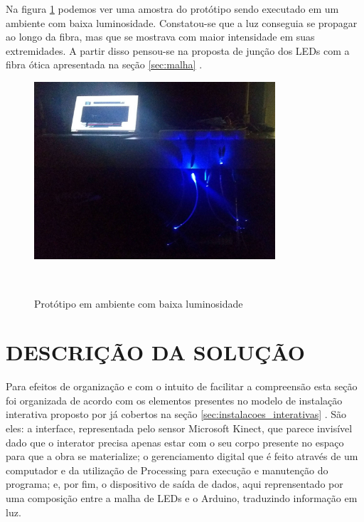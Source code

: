 Na figura \ref{fig:prototipo_escuro} podemos ver uma amostra do protótipo sendo executado em um ambiente com baixa luminosidade. Constatou-se que a luz conseguia se propagar ao longo da fibra, mas que se mostrava com maior intensidade em suas extremidades. A partir disso pensou-se na proposta de junção dos LEDs com a fibra ótica apresentada na seção \ref{sec:malha} .

\begin{figure}[H]
  \begin{center}
    \caption{Protótipo em ambiente com baixa luminosidade}
    \vspace*{0,2cm}
    \includegraphics[width=0.8\textwidth]{./04-figuras/prototipo_escuro}
    \label{fig:prototipo_escuro}
  \end{center}
  \vspace*{-0,9cm}
  \\
\end{figure}

\section{DESCRIÇÃO DA SOLUÇÃO}
\label{sec:solucao}

Para efeitos de organização e com o intuito de facilitar a compreensão esta seção foi organizada de acordo com os elementos presentes no modelo de instalação interativa proposto por \cite{sogabe2011} já cobertos na seção \ref{sec:instalacoes_interativas} . São eles: a interface, representada pelo sensor Microsoft Kinect, que parece invisível dado que o interator precisa apenas estar com o seu corpo presente no espaço para que a obra se materialize; o gerenciamento digital que é feito através de um computador e da utilização de Processing para execução e manutenção do programa; e, por fim, o dispositivo de saída de dados, aqui reprensentado por uma composição entre a malha de LEDs e o Arduino, traduzindo informação em luz.

